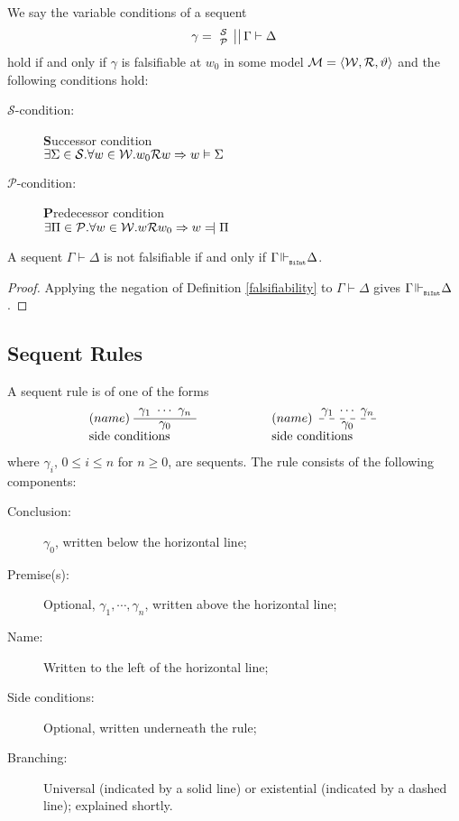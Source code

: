 \documentclass{llncs}
\numberwithin{equation}{section}
\newcommand{\Pred}{{\mathcal{P}}}
\newcommand{\Succ}{{\mathcal{S}}}
\newcommand{\Lg}[1]{\mathtt{#1}}
\newcommand{\sequent}{\vdash}
\newcommand{\Force}{\vDash}
\def\Reject{=\joinrel\mathrel|}
\newcommand{\MetaImp}{\Rightarrow}
\newcommand{\stacked}[2]{
\genfrac{}{}{0pt}{}{#1}{#2} 
 }
\newcommand{\mycal}[1]{
        {\cal{#1}}
}
\newcommand{\Sequent}[4]{
        \left. \left. \begin{array}{l} \hspace{-5pt} \stacked{#1}{#2}  \hspace{-5pt}\end{array} \ \right|\right| #3 \sequent #4
}
\newcommand{\SequentAny}{
        \Sequent{\Succ}{\Pred}{\Gamma}{\Delta}
}
\newcommand{\Model}{
        \mycal{M}=\langle \mycal{W}, \mycal{R}, \vartheta \rangle
}
\newcommand {\BiInt}{
        \Lg{BiInt}
}
\newcommand{\entails}{\hspace{-0.05cm}\Vdash_{_{\BiInt}}\hspace{-0.1cm}}
\begin{document}
\begin{definition}
We say the variable conditions of a sequent $$ \gamma = \SequentAny $$ hold if and only if $\gamma$ is falsifiable at $w_0$ in some model $\Model$ and the following conditions hold:
		\begin{description}
			\item[$\Succ$-condition:] \textbf{S}uccessor condition \\
				$\exists \Sigma \in \Succ . \forall w \in \mycal{W} .w_0 \mycal{R} w \MetaImp w \Force \Sigma$
			\item[$\Pred$-condition:] \textbf{P}redecessor condition  \\
				$\exists \Pi \in \Pred . \forall w \in \mycal{W} . w \mycal{R} w_0 \MetaImp w \Reject \Pi$				
		\end{description}		
\end{definition}

\begin{lemma}\label{notFalsifiable}
A sequent $\Gamma \sequent \Delta$ is not falsifiable if and only if $\Gamma \entails \Delta$.
\end{lemma}
\begin{proof}
Applying the negation of Definition \ref{falsifiability} to $\Gamma \sequent \Delta$ gives $\Gamma \entails \Delta$.\end{proof}

\subsection{Sequent Rules}

\begin{definition}
A sequent rule is of one of the forms
	$$
	\begin{array}{l}
												\AxiomC{$\gamma_1\  \cdots \ \gamma_n$}
			\LeftLabel{$(name)$}	\UnaryInfC{$\gamma_0$}	
		\DisplayProof \\
		\text{side conditions }
	\end{array}
	\ \ \ \ \ \ \ \ \ \ \ \ \ \ \ 
	\begin{array}{l}
												\AxiomC{$\gamma_1\  \cdots \ \gamma_n$}
			\LeftLabel{$(name)$}	\dashedLine \UnaryInfC{$\gamma_0$}	
		\DisplayProof \\
		\text{side conditions }
	\end{array}
	$$
where $\gamma_i$, $0 \leq i \leq n$ for $n \geq 0$, are sequents. The rule consists of the following components:
	\begin{description}
		\item[Conclusion:] $\gamma_0$, written below the horizontal line;
		\item[Premise(s):] Optional, $\gamma_1, \cdots, \gamma_n$, written above the horizontal line;
		\item[Name:] Written to the left of the horizontal line;
		\item[Side conditions:] Optional, written underneath the rule;
		\item[Branching:] Universal (indicated by a solid line) or existential (indicated by a dashed line); explained shortly.							
	\end{description}
\end{definition}
\end{document}
